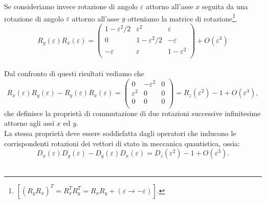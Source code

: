 Se consideriamo invece rotazione di angolo $\varepsilon$ attorno all'asse $x$ seguita da una rotazione di angolo $\varepsilon$ attorno all'asse $y$ otteniamo la matrice di rotazione\footnote{$\displaystyle{\left[\left( R_y R_x\right) ^T = R_x ^T R_y ^T=R_xR_y+(\varepsilon\rightarrow -\varepsilon)\right]}$.}.
	\begin{equation}
		R_y (\varepsilon)R_x (\varepsilon)=
		\begin{pmatrix}
			1-\varepsilon ^2/2 & \varepsilon ^2 & \varepsilon \\
			 0 & 1-\varepsilon ^2/2 & -\varepsilon \\
			-  \varepsilon & \varepsilon & 1-\varepsilon ^2 \\
		\end{pmatrix}
		+ O(\varepsilon ^3)
	\end{equation}\\
	
Dal confronto di questi risultati vediamo che
	\begin{equation}
		R_x (\varepsilon)R_y (\varepsilon)-R_y (\varepsilon)R_x (\varepsilon)=
		\begin{pmatrix}
			0 & - \varepsilon ^2 & 0 \\
			 \varepsilon ^2 & 0 & 0 \\
			0 & 0& 0\\
		\end{pmatrix}
		= R_z(\varepsilon ^2)-1+ O(\varepsilon ^3),
	\end{equation}
che definisce la proprietà di commutazione di due rotazioni successive infinitesime attorno agli assi $x$ ed $y$.\\

La stessa proprietà deve essere soddisfatta dagli operatori che inducono le corrispondenti rotazioni dei vettori di stato in meccanica quantistica, ossia:
	\begin{equation}
		D_x (\varepsilon)D_y (\varepsilon)-D_y (\varepsilon)D_x (\varepsilon)=D_z(\varepsilon ^2)-1+ O(\varepsilon ^3).
	\end{equation}\\
	
